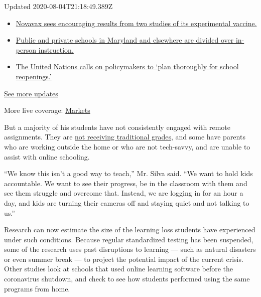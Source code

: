 Updated 2020-08-04T21:18:49.389Z

\begin{itemize}
\tightlist
\item
  \href{https://www.nytimes3xbfgragh.onion/2020/08/04/world/coronavirus-cases.html?action=click\&pgtype=Article\&state=default\&region=MAIN_CONTENT_1\&context=storylines_live_updates\#link-1228a480}{Novavax
  sees encouraging results from two studies of its experimental
  vaccine.}
\item
  \href{https://www.nytimes3xbfgragh.onion/2020/08/04/world/coronavirus-cases.html?action=click\&pgtype=Article\&state=default\&region=MAIN_CONTENT_1\&context=storylines_live_updates\#link-4825b93}{Public
  and private schools in Maryland and elsewhere are divided over
  in-person instruction.}
\item
  \href{https://www.nytimes3xbfgragh.onion/2020/08/04/world/coronavirus-cases.html?action=click\&pgtype=Article\&state=default\&region=MAIN_CONTENT_1\&context=storylines_live_updates\#link-50f7386d}{The
  United Nations calls on policymakers to `plan thoroughly for school
  reopenings.'}
\end{itemize}

\href{https://www.nytimes3xbfgragh.onion/2020/08/04/world/coronavirus-cases.html?action=click\&pgtype=Article\&state=default\&region=MAIN_CONTENT_1\&context=storylines_live_updates}{See
more updates}

More live coverage:
\href{https://www.nytimes3xbfgragh.onion/live/2020/08/04/business/stock-market-today-coronavirus?action=click\&pgtype=Article\&state=default\&region=MAIN_CONTENT_1\&context=storylines_live_updates}{Markets}

But a majority of his students have not consistently engaged with remote
assignments. They are
\href{https://www.nytimes3xbfgragh.onion/2020/04/30/us/coronavirus-high-school-grades.html}{not
receiving traditional grades}, and some have parents who are working
outside the home or who are not tech-savvy, and are unable to assist
with online schooling.

``We know this isn't a good way to teach,'' Mr. Silva said. ``We want to
hold kids accountable. We want to see their progress, be in the
classroom with them and see them struggle and overcome that. Instead, we
are logging in for an hour a day, and kids are turning their cameras off
and staying quiet and not talking to us.''

Research can now estimate the size of the learning loss students have
experienced under such conditions. Because regular standardized testing
has been suspended, some of the research uses past disruptions to
learning --- such as natural disasters or even summer break --- to
project the potential impact of the current crisis. Other studies look
at schools that used online learning software before the coronavirus
shutdown, and check to see how students performed using the same
programs from home.

